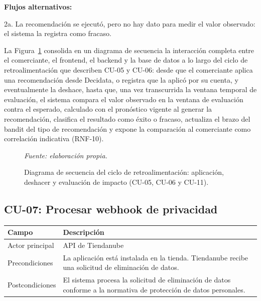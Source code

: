 \noindent\textbf{Flujos alternativos:}

\noindent 2a. La recomendación se ejecutó, pero no hay dato para medir el valor observado: el sistema la registra como fracaso.

La Figura~\ref{fig:seq-feedback-loop} consolida en un diagrama de secuencia la interacción completa entre el comerciante, el frontend, el backend y la base de datos a lo largo del ciclo de retroalimentación que describen CU-05 y CU-06: desde que el comerciante aplica una recomendación desde Decidata, o registra que la aplicó por su cuenta, y eventualmente la deshace, hasta que, una vez transcurrida la ventana temporal de evaluación, el sistema compara el valor observado en la ventana de evaluación contra el esperado, calculado con el pronóstico vigente al generar la recomendación, clasifica el resultado como éxito o fracaso, actualiza el brazo del bandit del tipo de recomendación y expone la comparación al comerciante como correlación indicativa (RNF-10).

\begin{figure}[ht]
    \centering
    
    \caption{Diagrama de secuencia del ciclo de retroalimentación: aplicación, deshacer y evaluación de impacto (CU-05, CU-06 y CU-11).}
    \label{fig:seq-feedback-loop}
\smallskip
\noindent\textit{Fuente: elaboración propia.}
\end{figure}

\subsection{CU-07: Procesar webhook de privacidad}
\label{sec:cu-07}

\begin{table}[h]
\centering
\renewcommand{\arraystretch}{1.3}
\begin{tabular}{|m{3cm}|m{11.3cm}|}
\hline
\textbf{Campo} & \textbf{Descripción} \\
\hline
Actor principal & API de Tiendanube \\
\hline
Precondiciones & La aplicación está instalada en la tienda. Tiendanube recibe una solicitud de eliminación de datos. \\
\hline
Postcondiciones & El sistema procesa la solicitud de eliminación de datos conforme a la normativa de protección de datos personales. \\
\hline
\end{tabular}
\end{table}

